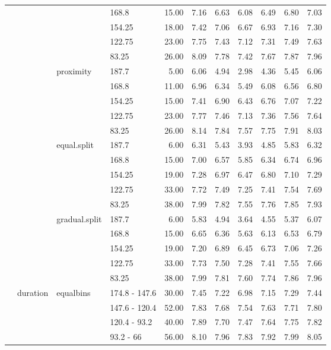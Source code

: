 \begin{longtable}{llllrrrrrrr}
   &  &  & 168.8 & 15.00 & 7.16 & 6.63 & 6.08 & 6.49 & 6.80 & 7.03 \\ 
   &  &  & 154.25 & 18.00 & 7.42 & 7.06 & 6.67 & 6.93 & 7.16 & 7.30 \\ 
   &  &  & 122.75 & 23.00 & 7.75 & 7.43 & 7.12 & 7.31 & 7.49 & 7.63 \\ 
   &  &  & 83.25 & 26.00 & 8.09 & 7.78 & 7.42 & 7.67 & 7.87 & 7.96 \\ 
   &  & proximity & 187.7 & 5.00 & 6.06 & 4.94 & 2.98 & 4.36 & 5.45 & 6.06 \\ 
   &  &  & 168.8 & 11.00 & 6.96 & 6.34 & 5.49 & 6.08 & 6.56 & 6.80 \\ 
   &  &  & 154.25 & 15.00 & 7.41 & 6.90 & 6.43 & 6.76 & 7.07 & 7.22 \\ 
   &  &  & 122.75 & 23.00 & 7.77 & 7.46 & 7.13 & 7.36 & 7.56 & 7.64 \\ 
   &  &  & 83.25 & 26.00 & 8.14 & 7.84 & 7.57 & 7.75 & 7.91 & 8.03 \\ 
   &  & equal.split & 187.7 & 6.00 & 6.31 & 5.43 & 3.93 & 4.85 & 5.83 & 6.32 \\ 
   &  &  & 168.8 & 15.00 & 7.00 & 6.57 & 5.85 & 6.34 & 6.74 & 6.96 \\ 
   &  &  & 154.25 & 19.00 & 7.28 & 6.97 & 6.47 & 6.80 & 7.10 & 7.29 \\ 
   &  &  & 122.75 & 33.00 & 7.72 & 7.49 & 7.25 & 7.41 & 7.54 & 7.69 \\ 
   &  &  & 83.25 & 38.00 & 7.99 & 7.82 & 7.55 & 7.76 & 7.85 & 7.93 \\ 
   &  & gradual.split & 187.7 & 6.00 & 5.83 & 4.94 & 3.64 & 4.55 & 5.37 & 6.07 \\ 
   &  &  & 168.8 & 15.00 & 6.65 & 6.36 & 5.63 & 6.13 & 6.53 & 6.79 \\ 
   &  &  & 154.25 & 19.00 & 7.20 & 6.89 & 6.45 & 6.73 & 7.06 & 7.26 \\ 
   &  &  & 122.75 & 33.00 & 7.73 & 7.50 & 7.28 & 7.41 & 7.55 & 7.66 \\ 
   &  &  & 83.25 & 38.00 & 7.99 & 7.81 & 7.60 & 7.74 & 7.86 & 7.96 \\ 
   & duration & equalbins & 174.8 - 147.6 & 30.00 & 7.45 & 7.22 & 6.98 & 7.15 & 7.29 & 7.44 \\ 
   &  &  & 147.6 - 120.4 & 52.00 & 7.83 & 7.68 & 7.54 & 7.63 & 7.71 & 7.80 \\ 
   &  &  & 120.4 - 93.2 & 40.00 & 7.89 & 7.70 & 7.47 & 7.64 & 7.75 & 7.82 \\ 
   &  &  & 93.2 - 66 & 56.00 & 8.10 & 7.96 & 7.83 & 7.92 & 7.99 & 8.05 \\ 

\end{longtable}
